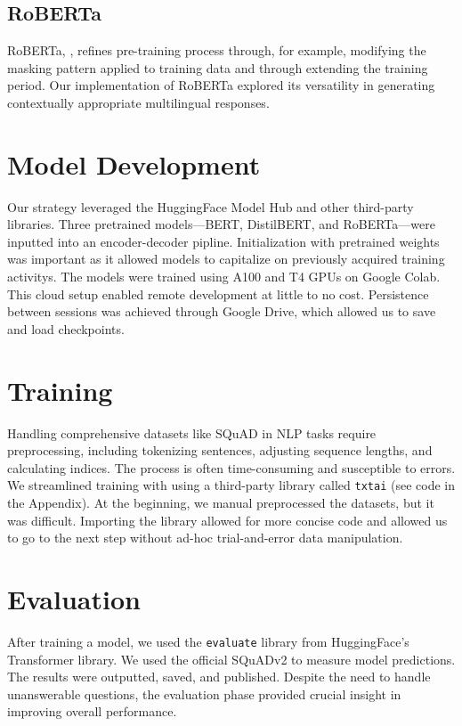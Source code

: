 \documentclass[12pt]{extarticle}
\begin{document}
\subsection{RoBERTa}
RoBERTa, \textcite{liu2019roberta}, refines pre-training process through, for example, modifying the masking pattern applied to training data and through extending the training period. Our implementation of RoBERTa explored its versatility in generating contextually appropriate multilingual responses.


\section{Model Development}

Our strategy leveraged the HuggingFace Model Hub and other third-party libraries. Three pretrained models---BERT, DistilBERT, and RoBERTa---were inputted into an encoder-decoder pipline. Initialization with pretrained weights was important as it allowed models to capitalize on previously acquired training activitys. The models were trained using A100 and T4 GPUs on Google Colab. This cloud setup enabled remote development at little to no cost. Persistence between sessions was achieved through Google Drive, which allowed us to save and load checkpoints.

\section{Training}

Handling comprehensive datasets like SQuAD in NLP tasks require preprocessing, including tokenizing sentences, adjusting sequence lengths, and calculating indices. The process is often time-consuming and susceptible to errors. We streamlined training with using a third-party library called \texttt{txtai} (see code in the Appendix). At the beginning, we manual preprocessed the datasets, but it was difficult. Importing the library allowed for more concise code and allowed us to go to the next step without ad-hoc trial-and-error data manipulation.

\section{Evaluation}

After training a model, we used the \texttt{evaluate} library from HuggingFace's Transformer library. We used the official SQuADv2 to measure model predictions. The results were outputted, saved, and published. Despite the need to handle unanswerable questions, the evaluation phase provided crucial insight in improving overall performance.
\end{document}
